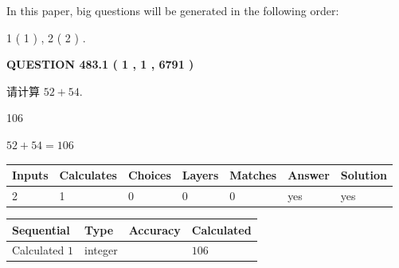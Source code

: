 \documentclass{ctexart}
\begin{document}
   
   
\vspace{0.2in}
   
In this paper, big questions will be generated in the following order: 
   
   
   1 ( 1 )
 ,
   2 ( 2 )
 .
  
\vspace{0.2in}
  
{\textbf{\Large{QUESTION
483.1 
 ( 1 , 1 , 6791 )
}}}
  
  
 
请计算 $ %
52 +  %
54 $.
 
 
 
\noindent{}
 
 

106
 
 
\noindent{}
 
 

 
 
 
\noindent{}
 
 

$ %
52 +  %
54=   %
106$
 
 
\noindent{}
 
 

 
   
   
   
   
\noindent\begin{tabular}{|l|l|l|l|l|l|l|}
 \hline
Inputs & Calculates & Choices & Layers & Matches & Answer & Solution \\ \hline
 2  & 
 1  & 
 0
  & 
 0  & 
 0  & 
  yes & 
  yes 
  \\ \hline
 \end{tabular}
   
   
   
   
\noindent{}
   
   
  
  
\noindent\begin{tabular}{|l|l|l|l|}
\hline
 Sequential & Type & Accuracy & Calculated \\ 
\hline
 
 
  Calculated $  1 $ & integer &  & 
  $ 106 $ 
 \\  \hline  
 \end{tabular}
   
\end{document}
